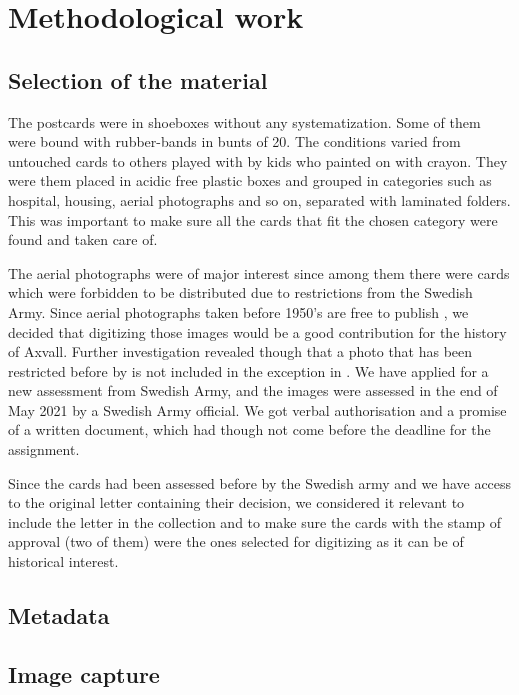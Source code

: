 \documentclass[12 pt]{paper}
\begin{document}
\section{Methodological work}%
\subsection{Selection of the material}

The postcards were in shoeboxes without any systematization. Some of them were bound with rubber-bands in bunts of 20. The conditions varied from untouched cards to others played with by kids who painted on with crayon. They were them placed in acidic free plastic boxes and grouped in categories such as hospital, housing, aerial photographs and so on, separated with laminated folders. This was important to make sure all the cards that fit the chosen category were found and taken care of.
 
The aerial photographs were of major interest since among them there were cards  which were forbidden to be distributed due to restrictions from the Swedish Army. Since aerial photographs taken before 1950's are free to publish \autocite[][kap. 3, 3§]{lantm2018}, we decided that digitizing those images would be a good contribution for the history of Axvall. Further investigation revealed though that a photo that has been restricted before by is not included in the exception in \textcite{lantm2018}. We have applied for a new assessment from Swedish Army, and the images were assessed in the end of May 2021 by a Swedish Army official. We got verbal authorisation and a promise of a written document, which had though not come before the deadline for the assignment. 

Since the cards had been assessed before by the Swedish army and we have access to the original letter containing their decision, we considered it relevant to include the letter in the collection and to make sure the cards with the stamp of approval (two of them) were the ones selected for digitizing as it can be of historical interest. 
\subsection{Metadata}

\subsection{Image capture}
\end{document}
